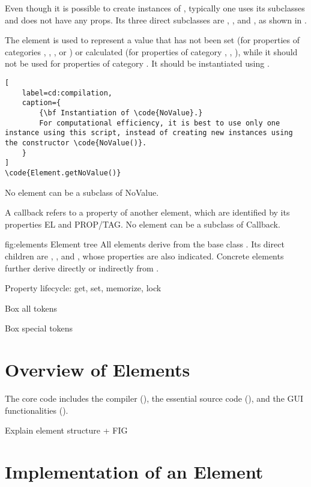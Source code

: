 \documentclass{tufte-handout}
\begin{document}
Even though it is possible to create instances of , typically one uses its subclasses and does not have any props.
Its three direct subclasses are , , and , as shown in .

The element  is used to represent a value that has not been set (for properties of categories , , ,  or ) or calculated (for properties of category , , ), while it should not be used for properties of category .
It should be instantiated using .
%
\begin{lstlisting}[
	label=cd:compilation,
	caption={
		{\bf Instantiation of \code{NoValue}.}
		For computational efficiency, it is best to use only one instance using this script, instead of creating new instances using the constructor \code{NoValue()}. 
	}
]
\code{Element.getNoValue()}
\end{lstlisting}
No element can be a subclass of NoValue.
  
  
 A callback refers to a property of another element, which are identified 
  by its properties EL and PROP/TAG.
  No element can be a subclass of Callback.

	{fig:elements}
	{}
	{Element tree}
	{All elements derive from the base class . 
	Its direct children are , , and , whose properties are also indicated.
	Concrete elements further derive directly or indirectly from .}

Property lifecycle: get, set, memorize, lock

Box all tokens 

Box special tokens 

\section{Overview of Elements}

The core code includes the compiler (), the essential source code (), and the GUI functionalities (). 

Explain element structure + FIG

\section{Implementation of an Element}
\end{document}

